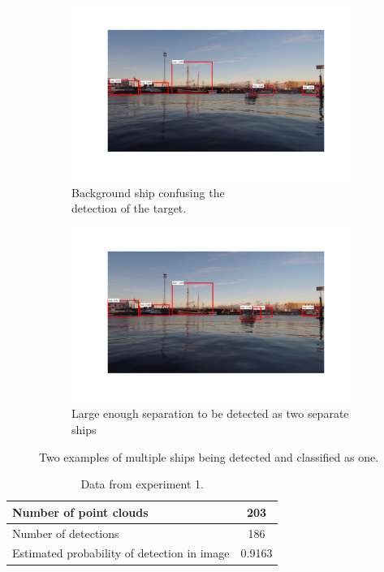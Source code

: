 \begin{figure}[H]
	\centering
	\begin{subfigure}[t]{.5\linewidth}
		\centering
		\includegraphics[width=\linewidth]{fig/exp_2_problem.png}
		\caption{Background ship confusing the\\ detection of the target.}
		\label{fig:sub_ex2_issue}
	\end{subfigure}%
	\begin{subfigure}[t]{.5\linewidth}
		\centering
		\includegraphics[width=\linewidth]{fig/exp2_past_problem.png}
		\caption{Large enough separation to be detected as two separate ships}
		\label{fig:sub_ex2_issue2}
	\end{subfigure}
	\caption{Two examples of multiple ships being detected and classified as one.}
	\label{fig:issues_ex2}
\end{figure} 
\begin{table}[H]
	\centering
	\begin{tabularx}{.7\linewidth}{L c}
		\toprule
		Number of point clouds & 203\\
		\midrule
		Number of detections & 186\\
		\midrule
		Estimated probability of detection in image & 0.9163 \\
		\bottomrule
	\end{tabularx}
	\caption{Data from experiment 1.}
	\label{tab:exp1}
\end{table}
